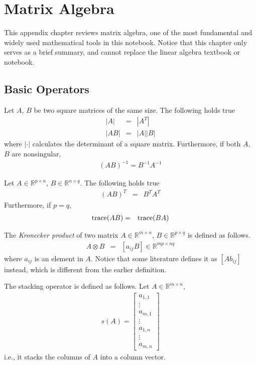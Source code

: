 \chapter{Matrix Algebra} \label{ch:matrixalgebra}

This appendix chapter reviews matrix algebra, one of the most fundamental and widely used mathematical tools in this notebook. Notice that this chapter only serves as a brief summary, and cannot replace the linear algebra textbook or notebook.

\section{Basic Operators}

Let $A$, $B$ be two square matrices of the same size. The following holds true
\begin{eqnarray}
|A| &=& |A^T| \nonumber \\
|AB| &=& |A||B| \nonumber
\end{eqnarray}
where $|\cdot|$ calculates the determinant of a square matrix. Furthermore, if both $A$, $B$ are nonsingular,
\begin{eqnarray}
	(AB)^{-1} = B^{-1}A^{-1} \nonumber
\end{eqnarray}

Let $A\in\mathbb{R}^{p\times n}$, $B\in\mathbb{R}^{n\times q}$. The following holds true
\begin{eqnarray}
(AB)^T &=& B^TA^T \nonumber
\end{eqnarray}
Furthermore, if $p=q$,
\begin{eqnarray}
	\textup{trace}(AB) &=& \textup{trace}(BA) \nonumber
\end{eqnarray}

The \textit{Kronecker product} of two matrix $A\in\mathbb{R}^{m\times n}$, $B\in\mathbb{R}^{p\times q}$ is defined as follows.
\begin{eqnarray}
	A\otimes B &=& [a_{ij}B] \in \mathbb{R}^{mp\times nq} \nonumber
\end{eqnarray}
where $a_{ij}$ is an element in $A$. Notice that some literature defines it as $[Ab_{ij}]$ instead, which is different from the earlier definition.

The stacking operator is defined as follows. Let $A\in\mathbb{R}^{m\times n}$,
\begin{eqnarray}
	s(A) = \left[\begin{array}{c}
		a_{1,1} \\
		\vdots \\
		a_{m, 1} \\
		\vdots \\
		a_{1, n} \\
		\vdots \\
		a_{m, n}
	\end{array}\right] \nonumber
\end{eqnarray}
i.e., it stacks the columns of $A$ into a column vector.


